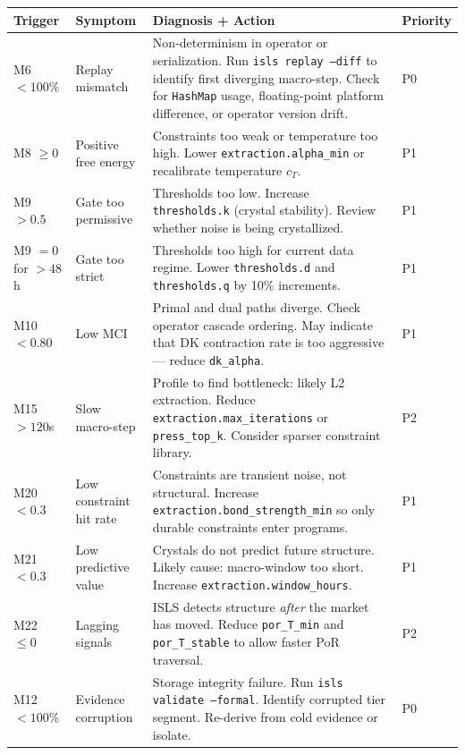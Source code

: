 \documentclass[10pt,a4paper]{article}
\begin{document}
\begin{longtable}{l p{3.5cm} p{5.5cm} l}
\toprule \textbf{Trigger} & \textbf{Symptom} & \textbf{Diagnosis + Action} & \textbf{Priority} \\
\midrule\endhead
M6 $<100\%$ & Replay mismatch & Non-determinism in operator or serialization. Run \texttt{isls replay --diff} to identify first diverging macro-step. Check for \texttt{HashMap} usage, floating-point platform difference, or operator version drift. & \textcolor{danger}{P0} \\
M8 $\geq 0$ & Positive free energy & Constraints too weak or temperature too high. Lower \texttt{extraction.alpha\_min} or recalibrate temperature $c_T$. & \textcolor{warn}{P1} \\
M9 $>0.5$ & Gate too permissive & Thresholds too low. Increase \texttt{thresholds.k} (crystal stability). Review whether noise is being crystallized. & \textcolor{warn}{P1} \\
M9 $=0$ for $>48$h & Gate too strict & Thresholds too high for current data regime. Lower \texttt{thresholds.d} and \texttt{thresholds.q} by 10\% increments. & \textcolor{warn}{P1} \\
M10 $<0.80$ & Low MCI & Primal and dual paths diverge. Check operator cascade ordering. May indicate that DK contraction rate is too aggressive --- reduce \texttt{dk\_alpha}. & \textcolor{warn}{P1} \\
M15 $>120$s & Slow macro-step & Profile to find bottleneck: likely L2 extraction. Reduce \texttt{extraction.max\_iterations} or \texttt{press\_top\_k}. Consider sparser constraint library. & \textcolor{warn}{P2} \\
M20 $<0.3$ & Low constraint hit rate & Constraints are transient noise, not structural. Increase \texttt{extraction.bond\_strength\_min} so only durable constraints enter programs. & \textcolor{warn}{P1} \\
M21 $<0.3$ & Low predictive value & Crystals do not predict future structure. Likely cause: macro-window too short. Increase \texttt{extraction.window\_hours}. & \textcolor{warn}{P1} \\
M22 $\leq 0$ & Lagging signals & ISLS detects structure \emph{after} the market has moved. Reduce \texttt{por\_T\_min} and \texttt{por\_T\_stable} to allow faster PoR traversal. & \textcolor{warn}{P2} \\
M12 $<100\%$ & Evidence corruption & Storage integrity failure. Run \texttt{isls validate --formal}. Identify corrupted tier segment. Re-derive from cold evidence or isolate. & \textcolor{danger}{P0} \\
\bottomrule
\end{longtable}
\end{document}

